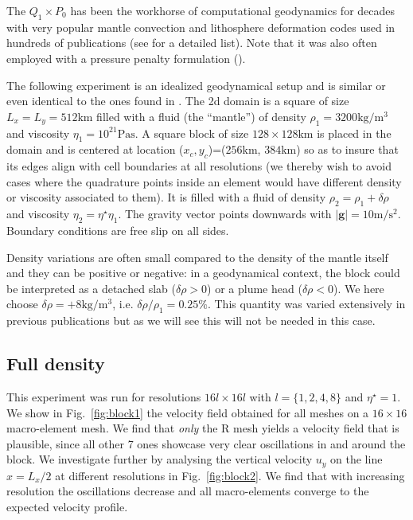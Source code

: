 \documentclass[a4paper,12pt]{article}
\begin{document}
The $Q_1\times P_0$ has been the workhorse of computational geodynamics for decades with 
very popular mantle convection and lithosphere deformation codes used in hundreds of publications
(see \cite{thba22} for a detailed list).
Note that it was also often employed with a pressure penalty formulation (\cite{kirh90,full95,brtf08}).

The following experiment is an idealized geodynamical setup
and is similar or even identical to the ones found in \cite{mamo08,gery10,thie11,sctc20,thba22,thba25}.
The 2d domain is a square of size $L_x=L_y=512$km filled with a fluid (the ``mantle'')
of density $\rho_1=3200\si{\kg\per\cubic\metre}$ 
and viscosity $\eta_1=10^{21}\si{\pascal\second}$.
A square block of size $128\times 128\si{\km}$ is placed in the domain and
is centered at location ($x_c,y_c$)=($256\si{\km}$, $384\si{\km}$) so 
as to insure that its edges
align with cell boundaries at all resolutions (we thereby wish to avoid
cases where the quadrature points inside an element would have different
density or viscosity associated to them). It is filled with a fluid
of density $\rho_2=\rho_1+\delta \rho$ and viscosity $\eta_2=\eta^\star \eta_1$.
The gravity vector points downwards with $|{\bm g}|=10\si{\metre\per\square\second}$. 
Boundary conditions are free slip on all sides.

Density variations are often small compared to the density of the mantle itself
and they can be positive or negative: in a geodynamical context, 
the block could be interpreted as a detached slab
($\delta\rho>0$) or a plume head ($\delta\rho<0$). 
We here choose $\delta \rho=+8\si{\kg\per\cubic\metre}$, i.e. $\delta \rho/\rho_1 = 0.25\%$.
This quantity was varied extensively in previous publications but as we will see 
this will not be needed in this case. 

\subsection{Full density}

This experiment was run for resolutions $16l\times 16l$ with $l=\{1,2,4,8\}$ and $\eta^\star=1$. 
We show in Fig.~\ref{fig:block1} the velocity field obtained for all meshes on 
a $16\times 16$ macro-element mesh. 
We find that {\it only} the R mesh yields a velocity field that is plausible, 
since all other 7 ones showcase very clear oscillations in and around the block.
We investigate further by analysing the vertical velocity $u_y$
on the line $x=L_x/2$ at different resolutions in Fig.~\ref{fig:block2}.
We find that with increasing resolution the oscillations decrease and 
all macro-elements converge to the expected velocity profile.
\end{document}

